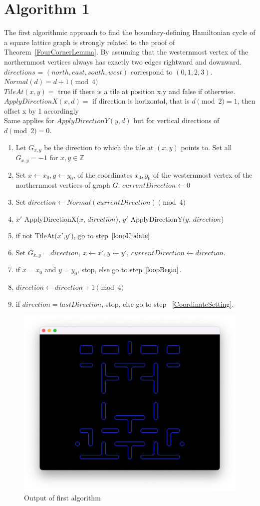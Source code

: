 \section{Algorithm 1}
The first algorithmic approach to find the boundary-defining Hamiltonian cycle of a square lattice graph is strongly related to the proof of Theorem~\ref{FourCornerLemma}. By assuming that the westernmost vertex of the northernmost vertices always has exactly two edges rightward and downward.
\\$directions$ = $(north,east,south,west)$ correspond to $(0,1,2,3)$.
\\$Normal(d) = d+1 \pmod{4}$
\\$TileAt(x,y) =$ true if there is a tile at position x,y and false if otherwise.
\\$ApplyDirectionX(x, d) =$ if direction is horizontal, that is $d \pmod{2} = 1$, then offset x by 1 accordingly
\\Same applies for $ApplyDirectionY(y,d)$ but for vertical directions of $d \pmod{2} = 0$.
\begin{enumerate}[\bf 1.]
\item Let $G_{x,y}$ be the direction to which the tile at $(x,y)$ points to. Set all $G_{x,y}=-1$ for $x,y \in \mathbb{Z}$
\item Set $x\gets x_0, y\gets y_0$, of the coordinates $x_0,y_0$ of the westernmost vertex of the northernmost vertices of graph $G$. $currentDirection\gets 0$
\item \label{loopBegin} Set $direction \gets Normal(currentDirection) \pmod{4}$
\item \label{CoordinateSetting} $x'$ \gets ApplyDirectionX($x$, $direction$), $y'$ \gets ApplyDirectionY($y$, $direction$)
\item if not TileAt($x'$,$y'$), go to step $\ref{loopUpdate}$
\item Set $G_{x,y} = direction$, $x \gets x', y \gets y'$, $currentDirection \gets direction$.
\item if $x=x_0$ and $y=y_0$, stop, else go to step $\ref{loopBegin}$.
\item \label{loopUpdate} $direction \gets direction+1 \pmod{4}$
\item if $direction = lastDirection$, stop, else go to step ~\ref{CoordinateSetting}.
\end{enumerate}
\begin{figure}[H]
\centering
\includegraphics[width=0.8\linewidth]{Image-8.png}
\caption {Output of first algorithm\autocite{myself}}\label{FirstOutput}
\end{figure}